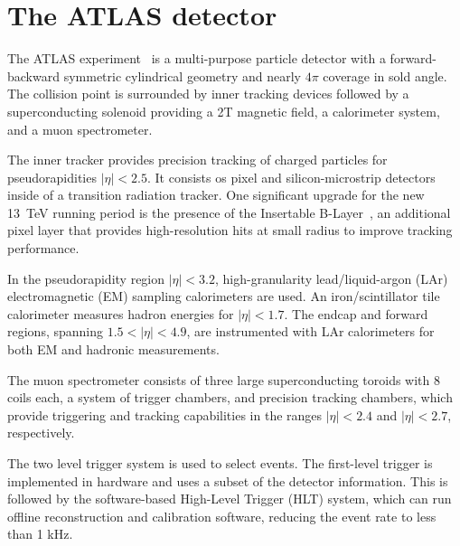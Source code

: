\section{The ATLAS detector}
\label{sec:ATLAS}

The ATLAS experiment~\cite{Collaboration_2008} is a multi-purpose particle detector with a forward-backward symmetric cylindrical geometry and nearly $4\pi$ coverage in sold angle.
The collision point is surrounded by inner tracking devices followed by a superconducting solenoid providing a 2T magnetic field, a calorimeter system, and a muon spectrometer.

The inner tracker provides precision tracking of charged particles for pseudorapidities $|\eta|<2.5$.
It consists os pixel and silicon-microstrip detectors inside of a transition radiation tracker.
One significant upgrade for the new 13~TeV running period is the presence of the Insertable B-Layer~\cite{Capeans:1291633}, an additional pixel layer that provides high-resolution hits at small radius to improve tracking performance.

In the pseudorapidity region $|\eta|<3.2$, high-granularity lead/liquid-argon (LAr) electromagnetic (EM) sampling calorimeters are used.
An iron/scintillator tile calorimeter measures hadron energies for $|\eta|<1.7$.
The endcap and forward regions, spanning $1.5 < |\eta| < 4.9$, are instrumented with LAr calorimeters for both EM and hadronic measurements.

The muon spectrometer consists of three large superconducting toroids with 8 coils each, a system of trigger chambers, and precision tracking chambers,  which provide triggering and tracking capabilities in the ranges $|\eta|<2.4$ and $|\eta|<2.7$, respectively.

The two level trigger system is used to select events.
The first-level trigger is implemented in hardware and uses a subset of the detector information.
This is followed by the software-based High-Level Trigger (HLT) system, which can run offline reconstruction and calibration software, reducing the event rate to less than 1 kHz.